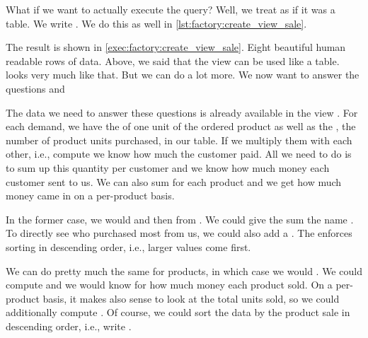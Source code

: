 What if we want to actually execute the query?
Well, we treat  as if it was a table.
We write .
We do this as well in \cref{lst:factory:create_view_sale}.

The result is shown in \cref{exec:factory:create_view_sale}.
Eight beautiful human readable rows of data.%
%
\FloatBarrier%
\endhsection%
%
%
%
%
%
%
%
%
%
Above, we said that the view  can be used like a table.
 looks very much like that.
But we can do a lot more.
We now want to answer the questions  and 

The data we need to answer these questions is already available in the view .
For each demand, we have the  of one unit of the ordered product as well as the , the number of product units purchased, in our table.
If we multiply them with each other, i.e., compute  we know how much the customer paid.
All we need to do is to sum up this quantity per customer and we know how much money each customer sent to us.
We can also sum  for each product and we get how much money came in on a per-product basis.%
%
\begin{sloppypar}%
In the former case, we would  and then  from .
We could give the sum the name .
To directly see who purchased most from us, we could also add a .
The  enforces sorting in descending order, i.e., larger values come first.%
\end{sloppypar}%
%
We can do pretty much the same for products, in which case we would .
We could compute  and we would know for how much money each product sold.
On a per-product basis, it makes also sense to look at the total units sold, so we could additionally compute .
Of course, we could sort the data by the product sale in descending order, i.e., write .

